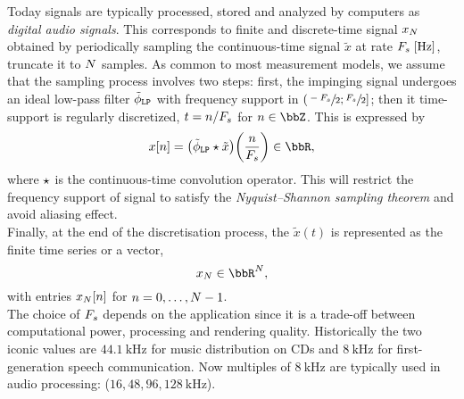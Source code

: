 \mynewline
Today signals are typically processed, stored and analyzed by computers as \textit{digital audio signals}.
This corresponds to finite and discrete-time signal $x_{N}$ obtained by periodically sampling the continuous-time signal $\tilde{x}$ at rate $\Fs\;[\si{\Hz}]$, truncate it to $N$ samples.
As common to most measurement models, we assume that the sampling process involves two steps:
first, the impinging signal undergoes an ideal low-pass filter $\lowpassfilter$ with frequency support in $\kintervoc{\sfrac{-\Fs}{2}}{\sfrac{\Fs}{2}}$;
then it time-support is regularly discretized, $t = n/F_s$ for $n \in \Z$.
This is expressed by
\begin{equation}\label{eq:processing:sampling}
    \mic[\idxSample] = \kparen{\lowpassfilter \convCont \tilde{x}}\kparen{\frac{n}{\Fs}} \in \R
    ,
\end{equation}
where $\star$ is the continuous-time convolution operator.
This will restrict the frequency support of signal to satisfy the \textit{Nyquist–Shannon sampling theorem} and avoid aliasing effect.
\\Finally, at the end of the discretisation process, the $\tilde{x}(t)$ is represented as the finite time series or a vector,
\begin{equation}
    \mic_{\numSample} \in \R^{\numSample}
    ,
\end{equation}
with entries $x_{N}[n]$ for $n = 0, \ldots, N-1$.
\\The choice of $F_s$ depends on the application since it is a trade-off between computational power, processing and rendering quality.
Historically the two iconic values are $\SI{44.1}{\kHz}$ for music distribution on CDs and $\SI{8}{\kHz}$ for first-generation speech communication.
Now multiples of $\SI{8}{\kHz}$ are typically used in audio processing: ($16, 48, 96, \SI{128}{\kHz}$).

